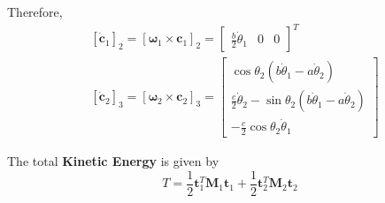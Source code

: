 \documentclass[conference]{IEEEtran}
\begin{document}
Therefore,
$$
    \begin{aligned}
         & {\left[\dot{\mathbf{c}}_1\right]_2=\left[\boldsymbol{\omega}_1 \times \mathbf{c}_1\right]_2=\left[\begin{array}{lll}
                                                                                                                             \frac{b}{2} \dot{\theta}_1 & 0 & 0
                                                                                                                         \end{array}\right]^T}                                                     \\
         & {\left[\dot{\mathbf{c}}_2\right]_3=\left[\boldsymbol{\omega}_2 \times \mathbf{c}_2\right]_3=\left[\begin{array}{c}
                                                                                                                             \cos \theta_2\left(b \dot{\theta}_1-a \dot{\theta}_2\right)                            \\
                                                                                                                             \frac{c}{2} \dot{\theta}_2-\sin \theta_2\left(b \dot{\theta}_1-a \dot{\theta}_2\right) \\
                                                                                                                             -\frac{c}{2} \cos \theta_2 \dot{\theta}_1
                                                                                                                         \end{array}\right]}
    \end{aligned}
$$

The total \textbf{Kinetic Energy} is given by
$$
    T=\frac{1}{2} \mathbf{t}_1^T \mathbf{M}_1 \mathbf{t}_1+\frac{1}{2} \mathbf{t}_2^T \mathbf{M}_2 \mathbf{t}_2
$$
\end{document}
